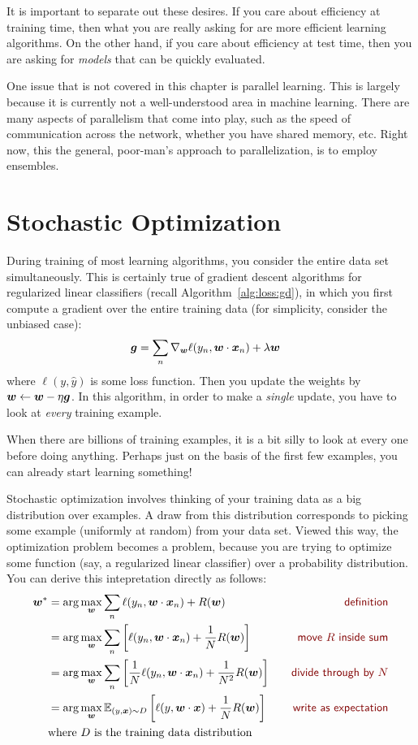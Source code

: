It is important to separate out these desires.  If you care about
efficiency at training time, then what you are really asking for are
more efficient learning algorithms.  On the other hand, if you care
about efficiency at test time, then you are asking for \emph{models}
that can be quickly evaluated.

One issue that is not covered in this chapter is parallel learning.
This is largely because it is currently not a well-understood area in
machine learning.  There are many aspects of parallelism that come
into play, such as the speed of communication across the network,
whether you have shared memory, etc.  Right now, this the general,
poor-man's approach to parallelization, is to employ ensembles.

\section{Stochastic Optimization}

During training of most learning algorithms, you consider the entire
data set simultaneously.  This is certainly true of gradient descent
algorithms for regularized linear classifiers (recall
Algorithm~\ref{alg:loss:gd}), in which you first compute a gradient
over the entire training data (for simplicity, consider the unbiased
case):
%
\begin{align}
{\boldsymbol{g}}
&= \sum_n \nabla_{{\boldsymbol{w}}} \ell(y_n, {\boldsymbol{w}} \cdot {\boldsymbol{x}}_n) + \lambda {\boldsymbol{w}}
\end{align}
%
where $\ell(y,\hat y)$ is some loss function.  Then you update the
weights by ${\boldsymbol{w}} \leftarrow {\boldsymbol{w}} - \eta {\boldsymbol{g}}$.  In this algorithm, in
order to make a \emph{single} update, you have to look at \emph{every}
training example.

When there are billions of training examples, it is a bit silly to
look at every one before doing anything.  Perhaps just on the basis of
the first few examples, you can already start learning something!

Stochastic optimization involves thinking of your training data as a
big distribution over examples.  A draw from this distribution
corresponds to picking some example (uniformly at random) from your
data set.  Viewed this way, the optimization problem becomes a
 problem, because you are trying to
optimize some function (say, a regularized linear classifier) over a
probability distribution.  You can derive this intepretation directly
as follows:
%
\begin{align}
\vw^*
&= \arg\max_{\vw} \sum_n \ell(y_n, \dotp{\vw}{\vx_n}) + R(\vw) 
\becauseof{definition}\\
&= \arg\max_{\vw} \sum_n \left[ \ell(y_n, \dotp{\vw}{\vx_n}) + \frac 1 N R(\vw) \right] 
\becauseof{move $R$ inside sum}\\
&= \arg\max_{\vw} \sum_n \left[ \frac 1 N \ell(y_n, \dotp{\vw}{\vx_n}) + \frac 1 {N^2} R(\vw) \right] 
\becauseof{divide through by $N$}\\
&= \arg\max_{\vw} \Ep_{(y,\vx) \sim D} \left[ \ell(y, \dotp{\vw}{\vx}) + \frac 1 N R(\vw) \right] 
\becauseof{write as expectation}\\
& \text{where } D \text{ is the training data distribution}
\end{align}
%

